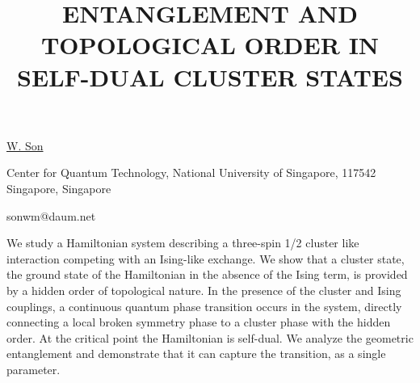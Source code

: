 \title{ENTANGLEMENT AND TOPOLOGICAL ORDER IN SELF-DUAL CLUSTER STATES}

\underline{W. Son} 

{\normalsize{\vspace{-4mm}
Center for Quantum Technology, National University of Singapore, 117542 Singapore, Singapore

\email sonwm@daum.net}}

We study a Hamiltonian system describing a three-spin 1/2 cluster like interaction competing with an Ising-like exchange. We show that a cluster state, the ground state of the Hamiltonian in the absence of the Ising term, is provided by a hidden order of topological nature. In the presence of the cluster and Ising couplings, a continuous quantum phase transition occurs in the system, directly connecting a local broken symmetry phase to a cluster phase with the hidden order. At the critical point the Hamiltonian is self-dual. We analyze the geometric entanglement and demonstrate that it can capture the transition, as a single parameter.

\vspace{\baselineskip} 